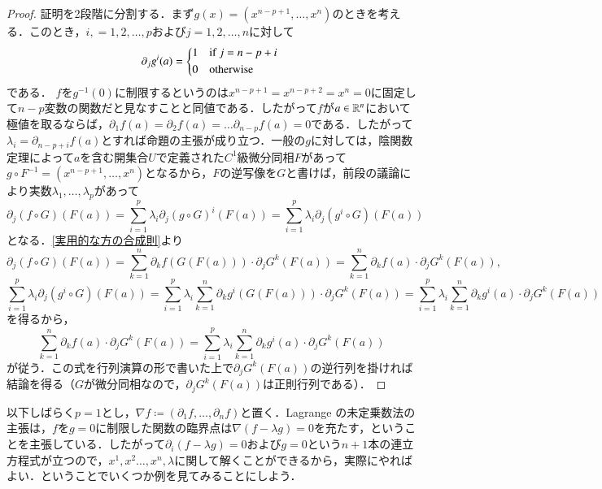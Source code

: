 \begin{proof}
証明を2段階に分割する．まず$g(x)= (x^{n-p+1}, \dots, x^n)$のときを考える．このとき，$i, = 1,2, \dots, p$および$j = 1,2, \dots, n$に対して
\begin{equation}
\partial_j g^i(a) = \begin{dcases*}
    1 & if $j = n-p+i$ \\
    0 & otherwise
  \end{dcases*}
\end{equation}
である．
$f$を$g^{-1}(0)$に制限するというのは$x^{n-p+1} = x^{n-p+2} = x^n=0$に固定して$n-p$変数の関数だと見なすことと同値である．したがって$f$が$a \in \mathbb{R}^n$において極値を取るならば，$\partial_1 f(a) = \partial_2 f(a) = \dots \partial_{n-p}f(a) =0$である．したがって$\lambda_i = \partial_{n-p+i} f(a)$とすれば命題の主張が成り立つ．一般の$g$に対しては，陰関数定理によって$a$を含む開集合$U$で定義された$C^1$級微分同相$F$があって$g \circ F^{-1} =  (x^{n-p+1}, \dots, x^n)$となるから，$F$の逆写像を$G$と書けば，前段の議論により実数$\lambda_1, \dots, \lambda_p$があって
\begin{equation}
\partial_j (f \circ G)(F(a)) = \sum_{i=1}^p \lambda_i \partial_j (g \circ G)^i(F(a)) = \sum_{i=1}^p \lambda_i \partial_j (g^i \circ G)(F(a))
\end{equation}となる．\cref{実用的な方の合成則}より
\begin{equation}
\partial_j (f \circ G)(F(a)) = \sum_{k=1}^n \partial_k f (G(F(a))) \cdot \partial_j G^k(F(a)) = \sum_{k=1}^n \partial_k f(a) \cdot \partial_j G^k(F(a)),
\end{equation}
\begin{equation}
\sum_{i=1}^p \lambda_i \partial_j (g^i \circ G)(F(a)) = \sum_{i=1}^p \lambda_i \sum_{k=1}^n \partial_k g^i (G(F(a))) \cdot \partial_j G^k(F(a)) = \sum_{i=1}^p \lambda_i \sum_{k=1}^n \partial_k g^i (a) \cdot \partial_j G^k(F(a)) 
\end{equation}を得るから，
\begin{equation}
\sum_{k=1}^n \partial_k f(a) \cdot \partial_j G^k(F(a)) = \sum_{i=1}^p \lambda_i \sum_{k=1}^n \partial_k g^i (a) \cdot \partial_j G^k(F(a))
\end{equation}が従う．この式を行列演算の形で書いた上で$\partial_j G^k(F(a))$の逆行列を掛ければ結論を得る（$G$が微分同相なので，$\partial_j G^k(F(a))$は正則行列である）．
\end{proof}

以下しばらく$p=1$とし，$\nabla f \coloneqq (\partial_1 f, \dots, \partial_n f)$と置く．Lagrange の未定乗数法の主張は，$f$を$g=0$に制限した関数の臨界点は$\nabla(f-\lambda g)=0$を充たす，ということを主張している．したがって$\partial_i (f - \lambda g)=0$および$g=0$という$n+1$本の連立方程式が立つので，$x^1,x^2\dots, x^n , \lambda$に関して解くことができるから，実際にやればよい．ということでいくつか例を見てみることにしよう．


